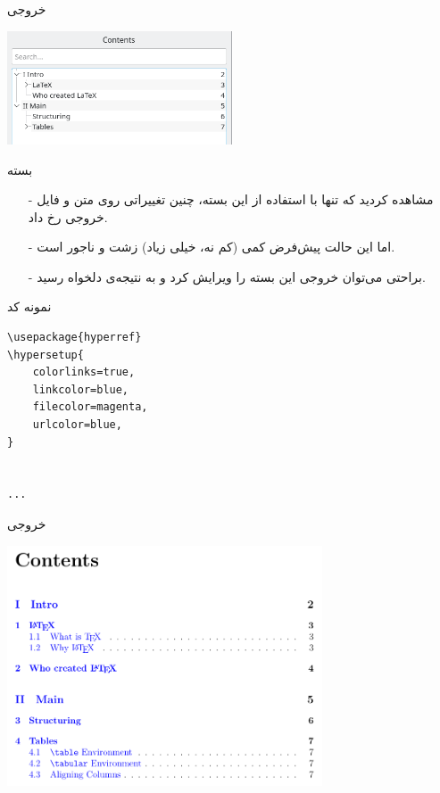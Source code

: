 \begin{frame}{خروجی}
\begin{center}
\includegraphics[width=0.5\textwidth, height=0.5\textheight]{docs/images/hyperref-affect}
\end{center}
\end{frame}

\begin{frame}{بسته }
\begin{itemize}\itemr
\item[-]
مشاهده‌ کردید که تنها با استفاده از این بسته، چنین تغییراتی روی متن و فایل  خروجی رخ داد.

\item[-]
اما این حالت پیش‌فرض کمی (کم نه، خیلی زیاد) زشت و ناجور است.

\item[-]
براحتی می‌توان خروجی این بسته را ویرایش کرد و به نتیجه‌ی دلخواه رسید.
\end{itemize}
\end{frame}

\begin{frame}[fragile]{نمونه کد}
\begin{latin}
\begin{lstlisting}[keywords={begin, end}, keywordstyle=\color{Mulberry}\textbf]
\usepackage{hyperref}
\hypersetup{
    colorlinks=true,
    linkcolor=blue,
    filecolor=magenta,      
    urlcolor=blue,
}


...

\end{lstlisting}
\end{latin}
\end{frame}

\begin{frame}{خروجی}
\begin{center}
\includegraphics[width=0.7\textwidth, height=0.8\textheight]{docs/images/hyperref-edited}
\end{center}
\end{frame}


